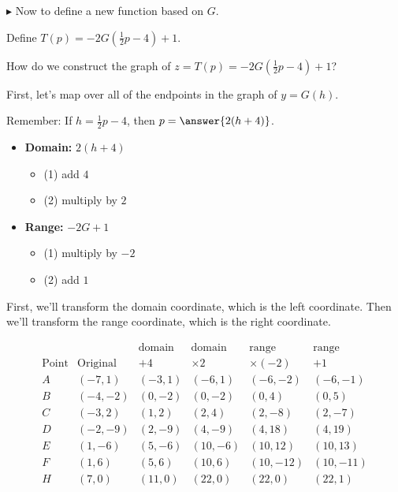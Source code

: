 \documentclass{ximera}
\begin{document}
\begin{example}
$\blacktriangleright$ Now to define a new function based on  $G$.






Define  $T(p) = -2G\left( \frac{1}{2} p - 4 \right) + 1$.


How do we construct the graph of $z = T(p) = -2G\left(\frac{1}{2} p - 4\right) + 1$?

First, let's map over all of the endpoints in the graph of $y = G(h)$.

Remember: If  $h = \frac{1}{2} p - 4$, then $p = \answer{2(h+4)}$.

\begin{itemize}
 \item \textbf{Domain:}  $2 (h+4)$ 
    \begin{itemize}
      \item (1) add $4$
      \item (2) multiply by $2$
    \end{itemize}

 \item \textbf{Range:}  $-2 G + 1$ 
    \begin{itemize}
      \item (1) multiply by $-2$
      \item (2) add $1$
    \end{itemize}
\end{itemize}


First, we'll transform the domain coordinate, which is the left coordinate.  Then we'll transform the range coordinate, which is the right coordinate.

\[
\begin{array}{c|l|l|l|l|l}
        &         &  \text{domain}  &  \text{domain}    &  \text{range}   & \text{range}         \\
\text{Point}    &  \text{Original}  &  +4           &  \times2   &  \times(-2)  & + 1          \\
\hline
A   &   (-7, 1)          &  (-3, 1)      &  (-6, 1)     &  (-6, -2)    &  (-6,-1)     \\
B   &   (-4, -2)         &  (0, -2)      &  (0, -2)     &  (0,4)      &  (0,5)       \\
C   &   (-3,2)           &  (1,2)        &  (2,4)       &  (2,-8)     &  (2,-7)     \\
D   &   (-2,-9)          &  (2, -9)      &  (4,-9)      &  (4, 18)    &  (4,19)      \\
E   &   (1,-6)           &  (5,-6)       &  (10,-6)     &  (10,12)    &  (10,13)     \\
F   &   (1,6)            &  (5, 6)       &  (10,6)      &  (10,-12)   &  (10,-11)   \\
H   &   (7,0)            &  (11,0)       &  (22,0)      &  (22,0)     &  (22,1)
\end{array}
\]





\end{example}
\end{document}
